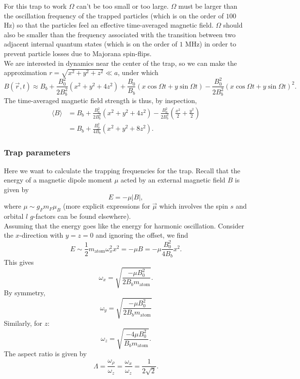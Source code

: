 \documentclass{book}
\theoremstyle{definition}
\newcommand{\f}[2]{\frac{#1}{#2}}
\newcommand{\lp}{\left(}
\newcommand{\rp}{\right)}
\begin{document}
For this trap to work $\Omega$ can't be too small or too large. $\Omega$ must be larger than the oscillation frequency of the trapped particles (which is on the order of $100$ Hz) so that the particles feel an effective time-averaged magnetic field. $\Omega$ should also be smaller than the frequency associated with the transition between two adjacent internal quantum states (which is on the order of $1$ MHz) in order to prevent particle losses due to Majorana spin-flips. \\


We are interested in dynamics near the center of the trap, so we can make the approximation $r = \sqrt{x^2 + y^2 + z^2} \ll a$, under which 
\begin{equation*}
B(\vec{r},t)\approx B_b + \f{B_0^2}{2B_b^2} (x^2 + y^2 + 4z^2) + \f{B_0}{B_b}(x\cos\Omega t+ y\sin\Omega t) - \f{B_0^2}{2B_b^2}(x\cos\Omega t + y\sin\Omega t)^2.
\end{equation*}
The time-averaged magnetic field strength is thus, by inspection,
\begin{align*}
\langle B \rangle 
&= B_b  + \f{B_0^2}{2B_b^2} (x^2 + y^2 + 4z^2) - \f{B_0^2}{2B_b^2}\lp \f{x^2}{2} + \f{y^2}{2}\rp\\ &= B_b + \f{B_0^2}{4B_b}(x^2 + y^2 + 8z^2).
\end{align*}


\subsubsection*{Trap parameters}
Here we want to calculate the trapping frequencies for the trap. Recall that the energy of a magnetic dipole moment $\mu$ acted by an external magnetic field $B$ is given by 
\begin{equation*}
E = -\mu |B|,
\end{equation*}
where $\mu \sim g_F m_F \mu_B$ (more explicit expressions for $\vec{\mu}$ which involves the spin $s$ and orbital $l$ $g$-factors can be found elsewhere).\\ 

Assuming that the energy goes like the energy for harmonic oscillation. Consider the $x$-direction with $y=z=0$ and ignoring the offset, we find
\begin{equation*}
E \sim \f{1}{2}m_\text{atom} \omega_x^2 x^2 = -\mu B = -\mu \f{B_0^2}{4B_b}x^2.
\end{equation*}
This gives
\begin{equation*}
\omega_x = \sqrt{\f{-\mu B_0^2}{2B_b m_\text{atom}}}.
\end{equation*}
By symmetry,
\begin{equation*}
\omega_y = \sqrt{\f{-\mu B_0^2}{2B_b m_\text{atom}}}
\end{equation*}
Similarly, for $z$:
\begin{equation*}
\omega_z = \sqrt{\f{-4\mu B_0^2}{B_b m_\text{atom}}}.
\end{equation*}
The aspect ratio is given by 
\begin{equation*}
\Lambda = \f{\omega_\rho}{\omega_z} = \f{\omega_x}{\omega_z} = {\f{1}{2\sqrt{2}}}.
\end{equation*}
\end{document}
